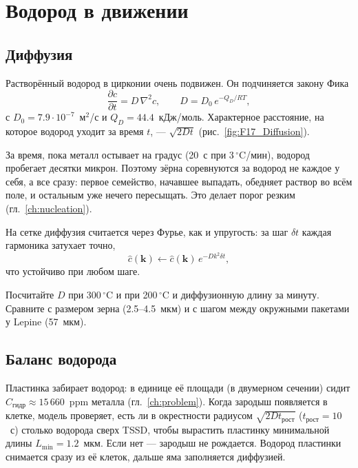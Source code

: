 \chapter{Водород в движении}\label{ch:hydrogen}

\section{Диффузия}

Растворённый водород в цирконии очень подвижен. Он подчиняется закону Фика
\begin{equation}
\frac{\partial c}{\partial t}=D\,\nabla^2c,\qquad D=D_0\,e^{-Q_D/RT},
\end{equation}
с $D_0=7.9\cdot10^{-7}$~м$^2$/с и $Q_D=44.4$~кДж/моль. Характерное расстояние, на которое
водород уходит за время $t$, --- $\sqrt{2Dt}$ (рис.~\ref{fig:F17_Diffusion}).


\begin{idea}
За время, пока металл остывает на градус (20~с при 3\,$^\circ$C/мин), водород пробегает десятки
микрон. Поэтому зёрна соревнуются за водород не каждое у себя, а все сразу: первое семейство,
начавшее выпадать, обедняет раствор во всём поле, и остальным уже нечего пересыщать. Это делает
порог резким (гл.~\ref{ch:nucleation}).
\end{idea}

На сетке диффузия считается через Фурье, как и упругость: за шаг $\delta t$ каждая гармоника
затухает точно,
\begin{equation}
\hat c(\mathbf k)\leftarrow\hat c(\mathbf k)\,e^{-Dk^2\delta t},
\end{equation}
что устойчиво при любом шаге.

\begin{exercise}
Посчитайте $D$ при 300\,$^\circ$C и при 200\,$^\circ$C и диффузионную длину за минуту.
Сравните с размером зерна (2.5--4.5~мкм) и с шагом между окружными пакетами у Lepine (57~мкм).
\end{exercise}

\section{Баланс водорода}

Пластинка забирает водород: в единице её площади (в двумерном сечении) сидит
$C_{\text{гидр}}\approx15\,660$~ppm металла (гл.~\ref{ch:problem}). Когда зародыш появляется в
клетке, модель проверяет, есть ли в окрестности радиусом $\sqrt{2D t_{\text{рост}}}$
($t_{\text{рост}}=10$~с) столько водорода сверх TSSD, чтобы вырастить пластинку минимальной
длины $L_{\min}=1.2$~мкм. Если нет --- зародыш не рождается. Водород пластинки снимается
сразу из её клеток, дальше яма заполняется диффузией.

